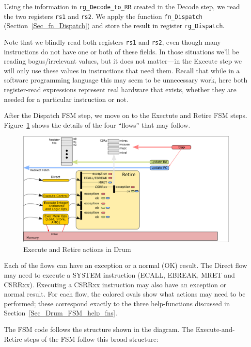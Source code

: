 

Using the information in \verb|rg_Decode_to_RR| created in the Decode
step, we read the two registers \verb|rs1| and \verb|rs2|.  We apply
the function \verb|fn_Dispatch| (Section~\ref{Sec_fn_Dispatch}) and
store the result in register \verb|rg_Dispatch|.

Note that we blindly read both registers \verb|rs1| and \verb|rs2|,
even though many instructions do not have one or both of these fields.
In those situations we'll be reading bogus/irrelevant values, but it
does not matter---in the Execute step we will only use these values in
instructions that need them. Recall that while in a software
programming language this may seem to be unnecessary work, here both
register-read expressions represent real hardware that exists, whether
they are needed for a particular instruction or not.

After the Dispatch FSM step, we move on to the Exectute and Retire FSM
steps.  Figure~\ref{Fig_Retire_Drum} shows the details of the four
``flows'' that may follow.
\begin{figure}[htbp]
  \centerline{\includegraphics[width=6in,angle=0]{Figures/Fig_Retire_Layers_1}}
  \caption{\label{Fig_Retire_Drum}Execute and Retire actions in Drum}
\end{figure}
Each of the flows can have an exception or a normal (OK) result.  The
Direct flow may need to execute a SYSTEM instruction (ECALL, EBREAK,
MRET and CSRRxx).  Executing a CSRRxx instruction may also have an
exception or normal result.  For each flow, the colored ovals show
what actions may need to be performed; these correspond exactly to the
three help-functions discussed in Section~\ref{Sec_Drum_FSM_help_fns}.

The FSM code follows the structure shown in the diagram.  The
Execute-and-Retire steps of the FSM follow this broad structure:

